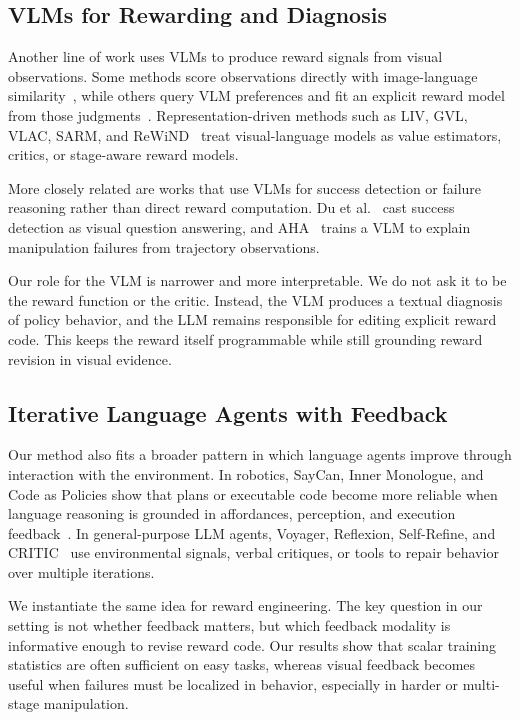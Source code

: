 \documentclass[conference]{IEEEtran}
\begin{document}
\subsection{VLMs for Rewarding and Diagnosis}

Another line of work uses VLMs to produce reward signals from visual
observations. Some methods score observations directly with image-language
similarity~\cite{rocamonde2024vlmrm,sontakke2023roboclip}, while others query
VLM preferences and fit an explicit reward model from those
judgments~\cite{wang2024rlvlmf,ghosh2025prefvlm}. Representation-driven methods
such as LIV, GVL, VLAC, SARM, and
ReWiND~\cite{ma2023liv,ma2025gvl,zhai2025vlac,chen2026sarm,zhang2025rewind}
treat visual-language models as value estimators, critics, or stage-aware reward
models.

More closely related are works that use VLMs for success detection or failure
reasoning rather than direct reward computation. Du et
al.~\cite{du2023successdetectors} cast success detection as visual question
answering, and AHA~\cite{duan2025aha} trains a VLM to explain manipulation
failures from trajectory observations.

Our role for the VLM is narrower and more interpretable. We do not ask it to be
the reward function or the critic. Instead, the VLM produces a textual diagnosis
of policy behavior, and the LLM remains responsible for editing explicit reward
code. This keeps the reward itself programmable while still grounding reward
revision in visual evidence.

\subsection{Iterative Language Agents with Feedback}

Our method also fits a broader pattern in which language agents improve through
interaction with the environment. In robotics, SayCan, Inner Monologue, and
Code as Policies show that plans or executable code become more reliable when
language reasoning is grounded in affordances, perception, and execution
feedback~\cite{ahn2022saycan,huang2023inner,liang2023code}. In general-purpose
LLM agents, Voyager, Reflexion, Self-Refine, and
CRITIC~\cite{wang2023voyager,shinn2023reflexion,madaan2023selfrefine,gou2024critic}
use environmental signals, verbal critiques, or tools to repair behavior over
multiple iterations.

We instantiate the same idea for reward engineering. The key question in our
setting is not whether feedback matters, but which feedback modality is
informative enough to revise reward code. Our results show that scalar training
statistics are often sufficient on easy tasks, whereas visual feedback becomes
useful when failures must be localized in behavior, especially in harder or
multi-stage manipulation.
\end{document}
